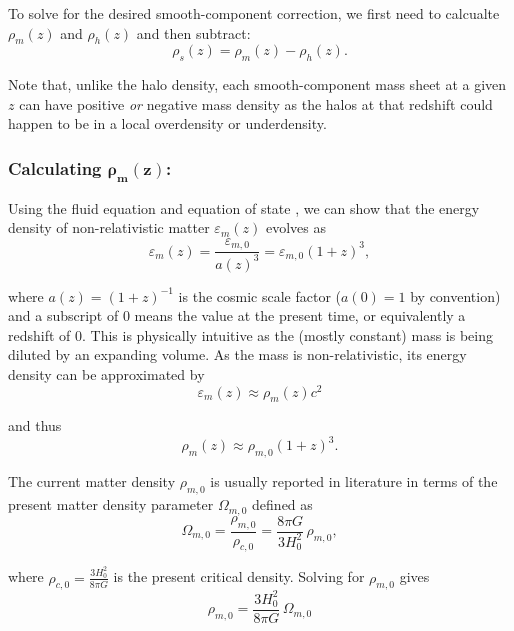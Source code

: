 \documentclass[%
 reprint,
 amsmath,amssymb,
 aps,nofootinbib
]{revtex4-1}
\begin{document}
To solve for the desired smooth-component correction, we first need to calcualte ${\rho_m(z)}$ and ${\rho_h(z)}$ and then subtract:
\begin{equation}\label{smooth_correction2}
\rho_s(z)=\rho_m(z)-\rho_h(z).
\end{equation}

\noindent Note that, unlike the halo density, each smooth-component mass sheet at a given $z$ can have positive \textit{or} negative mass density as the halos at that redshift could happen to be in a local overdensity or underdensity.

\subsubsection{Calculating $\mathbf{\rho_m(z)}$:}

Using the fluid equation and equation of state \cite{modern_cosmology}, we can show that the energy density of non-relativistic matter $\varepsilon_m(z)$ evolves as
\begin{equation}\label{energy_evol}
\varepsilon_m(z)=\frac{\varepsilon_{m,0}}{a(z)^3}=\varepsilon_{m,0}(1+z)^3,
\end{equation}

\noindent where $a(z)=(1+z)^{-1}$ is the cosmic scale factor (${a(0)=1}$ by convention) and a subscript of 0 means the value at the present time, or equivalently a redshift of 0. This is physically intuitive as the (mostly constant) mass is being diluted by an expanding volume. As the mass is non-relativistic, its energy density can be approximated by
\begin{equation*}\label{energy_mass}
\varepsilon_m(z)\approx\rho_m(z)c^2
\end{equation*}

\noindent and thus
\begin{equation}\label{mass_evol}
\rho_m(z)\approx\rho_{m,0}(1+z)^3.
\end{equation}

The current matter density $\rho_{m,0}$ is usually reported in literature in terms of the present matter density parameter $\Omega_{m,0}$ defined as
\begin{equation}\label{}
\Omega_{m,0}=\frac{\rho_{m,0}}{\rho_{c,0}}=\frac{8\pi G}{3H_0^2}\,\rho_{m,0},
\end{equation}

\noindent where $\rho_{c,0}=\frac{3H_0^2}{8\pi G}$ is the present critical density. Solving for $\rho_{m,0}$ gives
\begin{equation*}\label{}
\rho_{m,0}=\frac{3H_0^2}{8\pi G}\,\Omega_{m,0}
\end{equation*}
\end{document}
